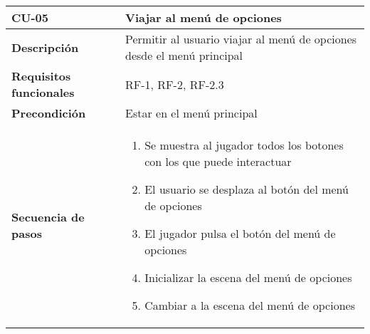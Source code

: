 \begin{tabularx}{\columnwidth}{l|l}
\begin{minipage}{0.25\columnwidth}
\textbf{CU-05} 
\end{minipage}
&
\begin{minipage}{0.65\columnwidth}
Viajar al menú de opciones
\end{minipage}
\\ \hline

\begin{minipage}{0.25\columnwidth}
\textbf{Descripción} 
\end{minipage}
&
\begin{minipage}{0.65\columnwidth}
Permitir al usuario viajar al menú de opciones desde el menú principal
\end{minipage}
\\ \hline

\begin{minipage}{0.25\columnwidth}
\textbf{Requisitos funcionales} 
\end{minipage}
&
\begin{minipage}{0.65\columnwidth}
RF-1, RF-2, RF-2.3
\end{minipage}
\\ \hline

\begin{minipage}{0.25\columnwidth}
\textbf{Precondición} 
\end{minipage}
&
\begin{minipage}{0.65\columnwidth}
Estar en el menú principal
\end{minipage}
\\ \hline

\begin{minipage}{0.25\columnwidth}
\textbf{Secuencia de pasos} 
\end{minipage}
&
\begin{minipage}{0.65\columnwidth}
\begin{enumerate}
\item
Se muestra al jugador todos los botones con los que puede interactuar
\item
El usuario se desplaza al botón del menú de opciones
\item
El jugador pulsa el botón del menú de opciones
\item
Inicializar la escena del menú de opciones
\item
Cambiar a la escena del menú de opciones
\end{enumerate}
\end{minipage}
\\ \hline


\end{tabularx}
